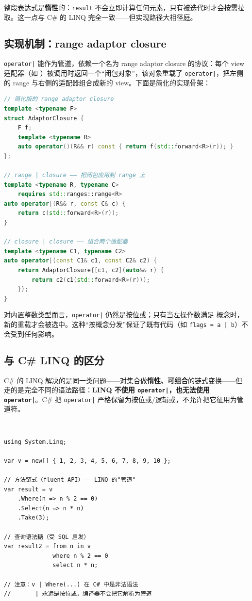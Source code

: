 \documentclass[12pt,a4paper,fontset=fandol]{ctexbook}
\newcommand{\Tp}[1]{\texttt{#1}}
\newcommand{\csharp}{C\#}
\newcommand{\Op}[1]{\texttt{operator#1}}
\newcommand{\csharplabel}{%
  \noindent\begin{tcolorbox}[sharp corners,colback=csharpheadbg,colframe=csharpheadbg,
    left=6pt,right=6pt,top=2pt,bottom=2pt,boxrule=0pt]
  \textcolor{white}{\small\bfseries\sffamily C\#}\end{tcolorbox}%
}
\begin{document}
整段表达式是\textbf{惰性}的：\Tp{result} 不会立即计算任何元素，只有被迭代时才会按需拉取。这一点与 \csharp{} 的 LINQ 完全一致——但实现路径大相径庭。

\subsection{实现机制：range adaptor closure}

\Op{|} 能作为管道，依赖一个名为 range adaptor closure 的协议：每个 view 适配器（如 ）被调用时返回一个``闭包对象''，该对象重载了 \Op{|}，把左侧的 range 与右侧的适配器组合成新的 view。下面是简化的实现骨架：

\begin{lstlisting}[language=C++]
// 简化版的 range adaptor closure
template <typename F>
struct AdaptorClosure {
    F f;
    template <typename R>
    auto operator()(R&& r) const { return f(std::forward<R>(r)); }
};

// range | closure —— 把闭包应用到 range 上
template <typename R, typename C>
    requires std::ranges::range<R>
auto operator|(R&& r, const C& c) {
    return c(std::forward<R>(r));
}

// closure | closure —— 组合两个适配器
template <typename C1, typename C2>
auto operator|(const C1& c1, const C2& c2) {
    return AdaptorClosure{[c1, c2](auto&& r) {
        return c2(c1(std::forward<R>(r)));
    }};
}
\end{lstlisting}

\begin{note}[title=语义的彻底改变]
对内置整数类型而言，\Op{|} 仍然是按位或；只有当左操作数满足  概念时，新的重载才会被选中。这种``按概念分发''保证了既有代码（如 \Tp{flags = a | b}）不会受到任何影响。
\end{note}

\subsection{与 \csharp{} LINQ 的区分}

\csharp{} 的 LINQ 解决的是同一类问题——对集合做\textbf{惰性、可组合}的链式变换——但走的是完全不同的语法路径：\textbf{LINQ 不使用 \Op{|}，也无法使用 \Op{|}}。\csharp{} 把 \Op{|} 严格保留为按位或/逻辑或，不允许把它征用为管道符。

\csharplabel

\begin{lstlisting}[language=CSharp]
using System.Linq;

var v = new[] { 1, 2, 3, 4, 5, 6, 7, 8, 9, 10 };

// 方法链式（fluent API）—— LINQ 的"管道"
var result = v
    .Where(n => n % 2 == 0)
    .Select(n => n * n)
    .Take(3);

// 查询语法糖（受 SQL 启发）
var result2 = from n in v
              where n % 2 == 0
              select n * n;

// 注意：v | Where(...) 在 C# 中是非法语法
//       | 永远是按位或，编译器不会把它解析为管道
\end{lstlisting}
\end{document}
